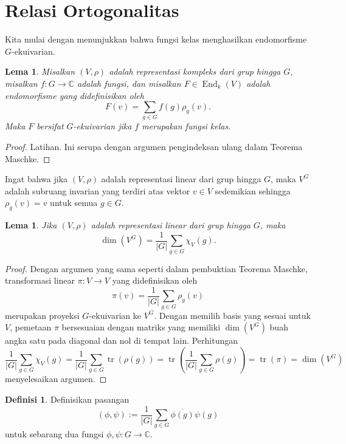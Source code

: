 \documentclass[12pt]{article}
\theoremstyle{plain}
\newtheorem{lemma}[theorem]{Lema}
\theoremstyle{definition}
\newtheorem{definition}[theorem]{Definisi}
\theoremstyle{remark}
\numberwithin{equation}{section}
\begin{document}
\section{Relasi Ortogonalitas}

Kita mulai dengan menunjukkan bahwa fungsi kelas menghasilkan
endomorfisme $G$-ekuivarian.

\begin{lemma} \label{lem:class_function_endo}
Misalkan $(V,\rho)$ adalah representasi kompleks dari grup hingga $G$,
misalkan $f : G \to \mathbb{C}$ adalah fungsi, dan misalkan $F \in
\operatorname{End}_k(V)$ adalah endomorfisme yang didefinisikan oleh
\[
F(v) = \sum_{g \in G} f(g)\rho_g(v) .
\]
Maka $F$ bersifat $G$-ekuivarian jika $f$ merupakan fungsi kelas.
\end{lemma}

\begin{proof}
Latihan. Ini serupa dengan argumen pengindeksan ulang dalam Teorema Maschke.
\end{proof}

Ingat bahwa jika $(V,\rho)$ adalah representasi linear dari grup hingga $G$,
maka $V^G$ adalah subruang invarian yang terdiri atas vektor
$v \in V$ sedemikian sehingga $\rho_g(v)=v$ untuk semua $g \in G$.

\begin{lemma} \label{lem:proj_onto_invariants}
Jika $(V,\rho)$ adalah representasi linear dari grup hingga $G$,
maka
\[ \dim(V^G) = \frac{1}{|G|} \sum_{g \in G} \chi_V(g). \]
\end{lemma}

\begin{proof}
Dengan argumen yang sama seperti dalam pembuktian Teorema Maschke,
transformasi linear $\pi : V \to V$ yang didefinisikan oleh
\[
\pi(v) = \frac{1}{|G|} \sum_{g \in G} \rho_g(v)
\]
merupakan proyeksi $G$-ekuivarian ke $V^G$.
Dengan memilih basis yang sesuai untuk $V$, pemetaan $\pi$ bersesuaian dengan
matriks yang memiliki $\dim(V^G)$ buah angka satu pada diagonal dan nol di tempat lain.
Perhitungan
\[
\frac{1}{|G|} \sum_{g \in G} \chi_V(g)
= \frac{1}{|G|} \sum_{g \in G} \operatorname{tr}( \rho(g) )
= \operatorname{tr}\left( \frac{1}{|G|} \sum_{g \in G}\rho(g) \right)
= \operatorname{tr}( \pi ) = \dim(V^G)
\]
menyelesaikan argumen.
\end{proof}

\begin{definition} \label{def:innerProduct}
Definisikan pasangan
\[
( \phi , \psi ) := \frac{1}{|G|}
\sum_{g \in G} \overline{\phi(g)} \psi(g)
\]
untuk sebarang dua fungsi $\phi, \psi : G \to \mathbb{C}$.
\end{definition}
\end{document}

